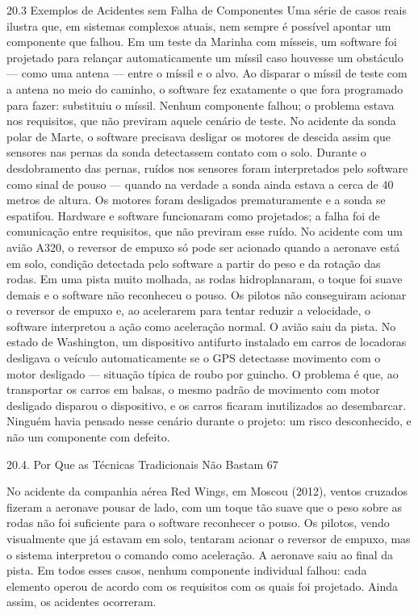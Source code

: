 20.3 Exemplos de Acidentes sem Falha de Componentes Uma série de casos reais ilustra que, em sistemas complexos atuais, nem sempre é possível apontar um componente que falhou. Em um teste da Marinha com mísseis, um software foi projetado para relançar automaticamente um míssil caso houvesse um obstáculo — como uma antena — entre o míssil e o alvo. Ao disparar o míssil de teste com a antena no meio do caminho, o software fez exatamente o que fora programado para fazer: substituiu o míssil. Nenhum componente falhou; o problema estava nos requisitos, que não previram aquele cenário de teste. No acidente da sonda polar de Marte, o software precisava desligar os motores de descida assim que sensores nas pernas da sonda detectassem contato com o solo. Durante o desdobramento das pernas, ruídos nos sensores foram interpretados pelo software como sinal de pouso — quando na verdade a sonda ainda estava a cerca de 40 metros de altura. Os motores foram desligados prematuramente e a sonda se espatifou. Hardware e software funcionaram como projetados; a falha foi de comunicação entre requisitos, que não previram esse ruído. No acidente com um avião A320, o reversor de empuxo só pode ser acionado quando a aeronave está em solo, condição detectada pelo software a partir do peso e da rotação das rodas. Em uma pista muito molhada, as rodas hidroplanaram, o toque foi suave demais e o software não reconheceu o pouso. Os pilotos não conseguiram acionar o reversor de empuxo e, ao acelerarem para tentar reduzir a velocidade, o software interpretou a ação como aceleração normal. O avião saiu da pista. No estado de Washington, um dispositivo antifurto instalado em carros de locadoras desligava o veículo automaticamente se o GPS detectasse movimento com o motor desligado — situação típica de roubo por guincho. O problema é que, ao transportar os carros em balsas, o mesmo padrão de movimento com motor desligado disparou o dispositivo, e os carros ficaram inutilizados ao desembarcar. Ninguém havia pensado nesse cenário durante o projeto: um risco desconhecido, e não um componente com defeito.

20.4. Por Que as Técnicas Tradicionais Não Bastam 67

No acidente da companhia aérea Red Wings, em Moscou (2012), ventos cruzados fizeram a aeronave pousar de lado, com um toque tão suave que o peso sobre as rodas não foi suficiente para o software reconhecer o pouso. Os pilotos, vendo visualmente que já estavam em solo, tentaram acionar o reversor de empuxo, mas o sistema interpretou o comando como aceleração. A aeronave saiu ao final da pista. Em todos esses casos, nenhum componente individual falhou: cada elemento operou de acordo com os requisitos com os quais foi projetado. Ainda assim, os acidentes ocorreram.

